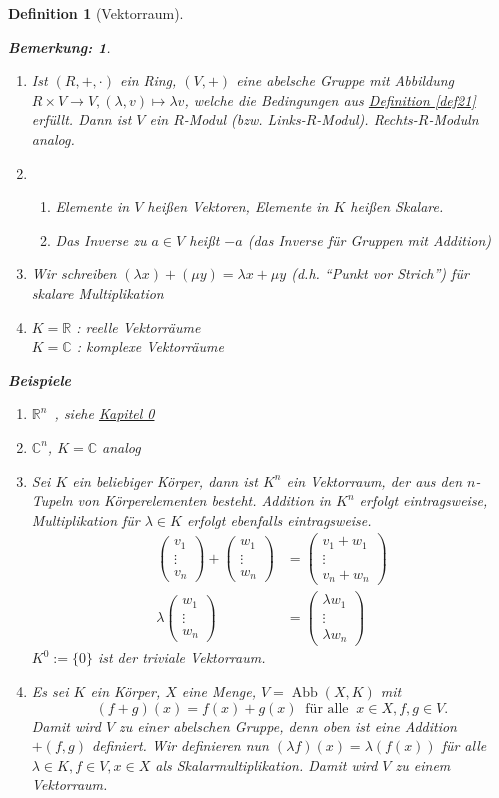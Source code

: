 \documentclass{report}
\newcommand{\lb}{\lambda}
\newcommand{\R}{\mathbb{R}}
\newcommand{\C}{\mathbb{C}}
\newcommand{\mRn}{$\mathbb{R}^n$\ }
\newcommand{\ve}[1]{{\begin{pmatrix}#1 \end{pmatrix}}}
\renewcommand{\v}{\ve}
\DeclareMathOperator{\abb}{Abb}
\theoremstyle{customrem}
\newtheorem*{bem}{Bemerkung:}
\theoremstyle{customdef}
\newtheorem{definition}{Definition}[chapter]
\begin{document}
\begin{definition}[Vektorraum]
		\begin{bem}$ $
			\begin{enumerate}
				\item Ist $(R, +, \cdot)$ ein Ring, $(V, +)$ eine abelsche Gruppe mit Abbildung $R \times V \to V, (\lb, v) \mapsto \lb v$, welche die Bedingungen aus \hyperref[def21]{Definition \ref{def21}} erfüllt. Dann ist $V$ ein $R$-Modul (bzw. Links-$R$-Modul).	Rechts-$R$-Moduln analog.
				\item
					\begin{enumerate}
						\item Elemente in $V$ heißen Vektoren, Elemente in $K$ heißen Skalare.
						\item Das Inverse zu $a \in V$ heißt $-a$ (das Inverse für Gruppen mit Addition)
					\end{enumerate}
				\item Wir schreiben $(\lb x) + (\mu y) = \lb x + \mu y$ (d.h. "`Punkt vor Strich"') für skalare Multiplikation
				\item
					$K = \R$ : reelle Vektorräume\\
					$K = \C$ : komplexe Vektorräume
			\end{enumerate}
		\end{bem}
		\noindent
		\textbf{Beispiele}
		\begin{enumerate}
			\item \mRn, siehe \hyperref[kap0]{Kapitel 0}
			\item $\C^n$, $K = \C$ analog
			\item Sei $K$ ein beliebiger Körper, dann ist $K^n$ ein Vektorraum, der aus den $n$-Tupeln von Körperelementen besteht. Addition in $K^n$ erfolgt eintragsweise, Multiplikation für $\lb \in K$ erfolgt ebenfalls eintragsweise.
			\begin{align*}
				\v{v_1\\ \vdots\\ v_n} + \v{w_1\\ \vdots\\ w_n} &= \v{v_1 + w_1\\ \vdots \\ v_n + w_n}\\[1em]
				\lb \v{w_1\\ \vdots\\ w_n} &= \v{\lb w_1\\ \vdots \\ \lb w_n}
			\end{align*}
			$K^0 := \{0\}$ ist der triviale Vektorraum.
			\item Es sei $K$ ein Körper, $X$ eine Menge, $V = \abb(X, K)$ mit
				$$(f + g)(x) = f(x) + g(x)\ \text{ für alle }\ x \in X, f, g \in V.$$
				Damit wird $V$ zu einer abelschen Gruppe, denn oben ist eine Addition $+(f, g)$ definiert. Wir definieren nun $(\lb f)(x) = \lb (f(x))$ für alle $\lb \in K, f \in V, x \in X$ als Skalarmultiplikation. Damit wird $V$ zu einem Vektorraum.
		\end{enumerate}
	\end{definition}
\end{document}

